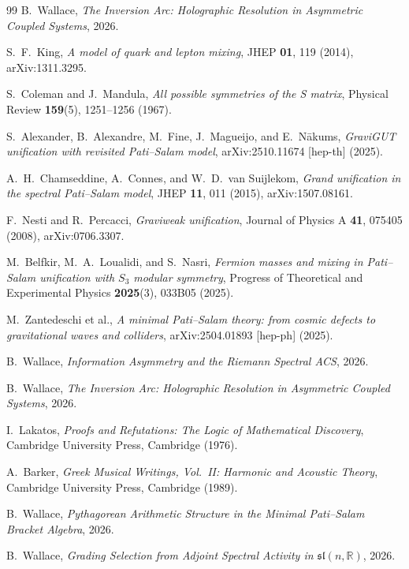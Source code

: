 \documentclass[11pt,a4paper]{article}
\theoremstyle{plain}
\theoremstyle{definition}
\theoremstyle{remark}
\begin{document}
\begin{thebibliography}{99}
B.~Wallace,
\textit{The Inversion Arc: Holographic Resolution in Asymmetric Coupled Systems},
2026.

S.~F.~King, \textit{A model of quark and lepton mixing},
JHEP \textbf{01}, 119 (2014), arXiv:1311.3295.

S.~Coleman and J.~Mandula,
\textit{All possible symmetries of the S matrix},
Physical Review \textbf{159}(5), 1251--1256 (1967).

S.~Alexander, B.~Alexandre, M.~Fine, J.~Magueijo, and E.~N\={a}kums,
\textit{GraviGUT unification with revisited Pati--Salam model},
arXiv:2510.11674 [hep-th] (2025).

A.~H.~Chamseddine, A.~Connes, and W.~D.~van Suijlekom,
\textit{Grand unification in the spectral Pati--Salam model},
JHEP \textbf{11}, 011 (2015), arXiv:1507.08161.

F.~Nesti and R.~Percacci,
\textit{Graviweak unification},
Journal of Physics A \textbf{41}, 075405 (2008), arXiv:0706.3307.

M.~Belfkir, M.~A.~Loualidi, and S.~Nasri,
\textit{Fermion masses and mixing in Pati--Salam unification with $S_3$ modular symmetry},
Progress of Theoretical and Experimental Physics \textbf{2025}(3), 033B05 (2025).

M.~Zantedeschi et al.,
\textit{A minimal Pati--Salam theory: from cosmic defects to gravitational waves and colliders},
arXiv:2504.01893 [hep-ph] (2025).

B.~Wallace,
\textit{Information Asymmetry and the Riemann Spectral ACS},
2026.

B.~Wallace,
\textit{The Inversion Arc: Holographic Resolution in Asymmetric Coupled Systems},
2026.

I.~Lakatos,
\textit{Proofs and Refutations: The Logic of Mathematical Discovery},
Cambridge University Press, Cambridge (1976).

A.~Barker,
\textit{Greek Musical Writings, Vol.~II: Harmonic and Acoustic Theory},
Cambridge University Press, Cambridge (1989).

B.~Wallace,
\textit{Pythagorean Arithmetic Structure in the Minimal Pati--Salam
Bracket Algebra},
2026.

B.~Wallace,
\textit{Grading Selection from Adjoint Spectral Activity
in $\mathfrak{sl}(n,\mathbb{R})$},
2026.

\end{thebibliography}
\end{document}

